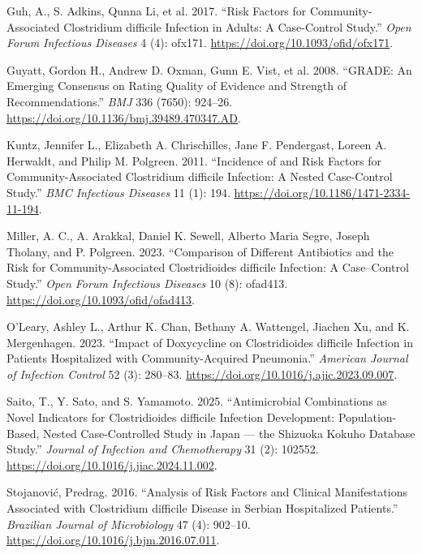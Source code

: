 \documentclass[
  letterpaper,
  DIV=11,
  numbers=noendperiod]{scrartcl}
\newlength{\cslhangindent}
\newenvironment{CSLReferences}[2] %
 {\begin{list}{}{%
  \setlength{\itemindent}{0pt}
  \setlength{\leftmargin}{0pt}
  \setlength{\parsep}{0pt}
  \ifodd #1
   \setlength{\leftmargin}{\cslhangindent}
   \setlength{\itemindent}{-1\cslhangindent}
  \fi
  \setlength{\itemsep}{#2\baselineskip}}}
 {\end{list}}
\begin{document}
\begin{CSLReferences}{1}{1}
Guh, A., S. Adkins, Qunna Li, et al. 2017. {``Risk Factors for
Community-Associated {Clostridium difficile} Infection in Adults: A
Case-Control Study.''} \emph{Open Forum Infectious Diseases} 4 (4):
ofx171. \url{https://doi.org/10.1093/ofid/ofx171}.

Guyatt, Gordon H., Andrew D. Oxman, Gunn E. Vist, et al. 2008.
{``{GRADE}: An Emerging Consensus on Rating Quality of Evidence and
Strength of Recommendations.''} \emph{BMJ} 336 (7650): 924--26.
\url{https://doi.org/10.1136/bmj.39489.470347.AD}.

Kuntz, Jennifer L., Elizabeth A. Chrischilles, Jane F. Pendergast,
Loreen A. Herwaldt, and Philip M. Polgreen. 2011. {``Incidence of and
Risk Factors for Community-Associated {Clostridium difficile} Infection:
A Nested Case-Control Study.''} \emph{BMC Infectious Diseases} 11 (1):
194. \url{https://doi.org/10.1186/1471-2334-11-194}.

Miller, A. C., A. Arakkal, Daniel K. Sewell, Alberto Maria Segre, Joseph
Tholany, and P. Polgreen. 2023. {``Comparison of Different Antibiotics
and the Risk for Community-Associated {Clostridioides difficile}
Infection: A Case--Control Study.''} \emph{Open Forum Infectious
Diseases} 10 (8): ofad413. \url{https://doi.org/10.1093/ofid/ofad413}.

O'Leary, Ashley L., Arthur K. Chan, Bethany A. Wattengel, Jiachen Xu,
and K. Mergenhagen. 2023. {``Impact of Doxycycline on {Clostridioides
difficile} Infection in Patients Hospitalized with Community-Acquired
Pneumonia.''} \emph{American Journal of Infection Control} 52 (3):
280--83. \url{https://doi.org/10.1016/j.ajic.2023.09.007}.

Saito, T., Y. Sato, and S. Yamamoto. 2025. {``Antimicrobial Combinations
as Novel Indicators for {Clostridioides difficile} Infection
Development: Population-Based, Nested Case-Controlled Study in {Japan}
--- the {Shizuoka Kokuho} Database Study.''} \emph{Journal of Infection
and Chemotherapy} 31 (2): 102552.
\url{https://doi.org/10.1016/j.jiac.2024.11.002}.

Stojanović, Predrag. 2016. {``Analysis of Risk Factors and Clinical
Manifestations Associated with {Clostridium difficile} Disease in
{Serbian} Hospitalized Patients.''} \emph{Brazilian Journal of
Microbiology} 47 (4): 902--10.
\url{https://doi.org/10.1016/j.bjm.2016.07.011}.


\end{CSLReferences}
\end{document}
